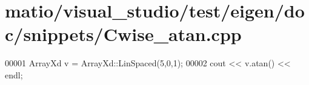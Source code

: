 \hypertarget{matio_2visual__studio_2test_2eigen_2doc_2snippets_2_cwise__atan_8cpp_source}{}\section{matio/visual\+\_\+studio/test/eigen/doc/snippets/\+Cwise\+\_\+atan.cpp}
\label{matio_2visual__studio_2test_2eigen_2doc_2snippets_2_cwise__atan_8cpp_source}

\begin{DoxyCode}
00001 ArrayXd v = ArrayXd::LinSpaced(5,0,1);
00002 cout << v.atan() << endl;
\end{DoxyCode}
